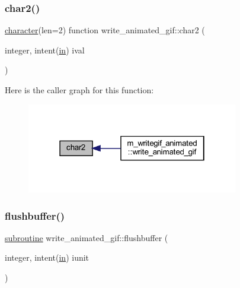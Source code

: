\subsubsection{\texorpdfstring{char2()}{char2()}}
{\footnotesize\ttfamily \hyperlink{option__stopwatch_83_8txt_abd4b21fbbd175834027b5224bfe97e66}{character}(len=2) function write\+\_\+animated\+\_\+gif\+::char2 (\begin{DoxyParamCaption}\item[{integer, intent(\hyperlink{M__journal_83_8txt_afce72651d1eed785a2132bee863b2f38}{in})}]{ival }\end{DoxyParamCaption})\hspace{0.3cm}{\ttfamily [private]}}

Here is the caller graph for this function\+:
\nopagebreak
\begin{figure}[H]
\begin{center}
\leavevmode
\includegraphics[width=262pt]{M__writegif__animated_8f90_a795066c06f318c8d4ba41430b6826567_icgraph}
\end{center}
\end{figure}
\mbox{\label{M__writegif__animated_8f90_a83cb0569b0e010d8ad27afd1b4cd945e}} 
\subsubsection{\texorpdfstring{flushbuffer()}{flushbuffer()}}
{\footnotesize\ttfamily \hyperlink{M__stopwatch_83_8txt_acfbcff50169d691ff02d4a123ed70482}{subroutine} write\+\_\+animated\+\_\+gif\+::flushbuffer (\begin{DoxyParamCaption}\item[{integer, intent(\hyperlink{M__journal_83_8txt_afce72651d1eed785a2132bee863b2f38}{in})}]{iunit }\end{DoxyParamCaption})\hspace{0.3cm}{\ttfamily [private]}}

